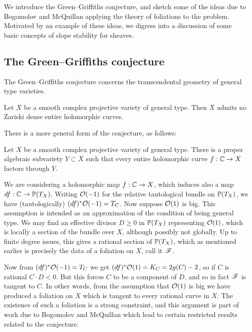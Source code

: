 
We introduce the Green--Griffiths conjecture, and sketch some of the ideas due
to Bogomolov and McQuillan applying the theory of foliations to the problem.
Motivated by an example of these ideas, we digress into a discussion of some
basic concepts of slope stability for sheaves.

\subsection{The Green--Griffiths conjecture}

The Green--Griffiths conjecture concerns the transcendental geometry of general
type varieties.

\begin{conjecture}
    Let $X$ be a smooth complex projective variety of general type. Then $X$
    admits no Zariski dense entire holomorphic curves.
\end{conjecture}

There is a more general form of the conjecture, as follows:

\begin{conjecture}
    Let $X$ be a smooth complex projective variety of general type. There is a
    proper algebraic subvariety $Y\subset X$ such that every entire holomorphic
    curve $f:\C\to X$ factors through $Y$.
\end{conjecture}

We are considering a holomorphic map $f:\C\to X$, which induces also a map
$df:\C\to\P(T_X)$. Writing $\O(-1)$ for the relative tautological bundle on
$\P(T_X)$, we have (tautologically) $(df)^*\O(-1)=T_C$. Now suppose $\O(1)$ is
big. This assumption is intended as an approximation of the condition of being
general type. We may find an effective divisor $D\ge0$ in $\P(T_X)$ representing
$\O(1)$, which is locally a section of the bundle over $X$, although possibly
not globally. Up to finite degree issues, this gives a rational section of
$\P(T_X)$, which as mentioned earlier is precisely the data of a foliation on
$X$, call it $\scrF$.

Now from $(df)^*\O(-1)=T_C$ we get $(df)^*\O(1)=K_C=2g(C)-2$, so if $C$ is
rational $C\cdot D<0$. But this forces $C$ to be a component of $D$, and so in
fact $\scrF$ is tangent to $C$. In other words, from the assumption that $\O(1)$
is big we have produced a foliation on $X$ which is tangent to every rational
curve in $X$. The existence of such a foliation is a strong constraint, and this
argument is part of work due to Bogomolov and McQuillan \cite{mcquillan_98}
which lead to certain restricted results related to the conjecture.

